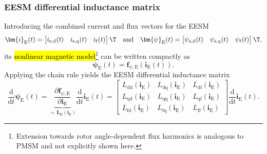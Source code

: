 \begin{frame}
    \frametitle{EESM differential inductance matrix}
    Introducing the combined current and flux vectors for the EESM
    \begin{equation}
        \bm{i}_\mathrm{E}(t) = \begin{bmatrix} i_\mathrm{s,d}(t) & i_\mathrm{s,q}(t) & i_\mathrm{f}(t) \end{bmatrix}\T
        \quad  \text{and} \quad
        \bm{\psi}_\mathrm{E}(t) = \begin{bmatrix} \psi_\mathrm{s,d}(t) & \psi_\mathrm{s,q}(t) & \psi_\mathrm{f}(t) \end{bmatrix}\T,
    \end{equation}\pause
    its \hl{nonlinear magnetic model}\footnote{Extension towards rotor angle-dependent flux harmonics is analogous to PMSM and not explicitly shown here.} can be written compactly as
    \begin{equation}
        \bm{\psi}_\mathrm{E}(t) = \bm{f}_{\psi,\mathrm{E}}(\bm{i}_\mathrm{E}(t)).
    \end{equation}\pause
    Applying the chain rule yields the EESM differential inductance matrix
    \begin{equation}
        \frac{\mathrm{d}}{\mathrm{d}t}\bm{\psi}_\mathrm{E}(t) = \underbrace{\frac{\partial \bm{f}_{\psi,\mathrm{E}}}{\partial \bm{i}_\mathrm{E}}}_{\displaystyle=\,\bm{L}_\mathrm{E}(\bm{i}_\mathrm{E})} \frac{\mathrm{d}}{\mathrm{d}t}\bm{i}_\mathrm{E}(t)
        = \begin{bmatrix}
            L_{\mathrm{dd}}(\bm{i}_\mathrm{E}) & L_{\mathrm{dq}}(\bm{i}_\mathrm{E}) & L_{\mathrm{df}}(\bm{i}_\mathrm{E}) \\
            L_{\mathrm{qd}}(\bm{i}_\mathrm{E}) & L_{\mathrm{qq}}(\bm{i}_\mathrm{E}) & L_{\mathrm{qf}}(\bm{i}_\mathrm{E}) \\
            L_{\mathrm{fd}}(\bm{i}_\mathrm{E}) & L_{\mathrm{fq}}(\bm{i}_\mathrm{E}) & L_{\mathrm{ff}}(\bm{i}_\mathrm{E})
        \end{bmatrix} \frac{\mathrm{d}}{\mathrm{d}t}\bm{i}_\mathrm{E}(t).
    \end{equation}
\end{frame}


